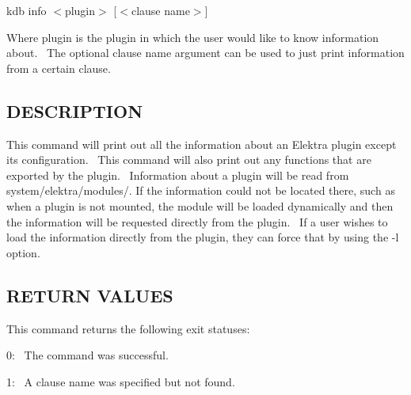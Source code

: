 {\ttfamily kdb info $<$plugin$>$ \mbox{[}$<$clause name$>$\mbox{]}}~\newline


Where {\ttfamily plugin} is the plugin in which the user would like to know information about.~\newline
 The optional {\ttfamily clause name} argument can be used to just print information from a certain clause.~\newline


\subsection*{D\+E\+S\+C\+R\+I\+P\+T\+I\+ON}

This command will print out all the information about an Elektra plugin except it\textquotesingle{}s configuration.~\newline
 This command will also print out any functions that are exported by the plugin.~\newline
 Information about a plugin will be read from {\ttfamily system/elektra/modules/}. If the information could not be located there, such as when a plugin is not mounted, the module will be loaded dynamically and then the information will be requested directly from the plugin.~\newline
 If a user wishes to load the information directly from the plugin, they can force that by using the {\ttfamily -\/l} option.~\newline


\subsection*{R\+E\+T\+U\+RN V\+A\+L\+U\+ES}

This command returns the following exit statuses\+:~\newline



\begin{DoxyItemize}
\item 0\+:~\newline
 The command was successful.~\newline

\item 1\+:~\newline
 A {\ttfamily clause name} was specified but not found.~\newline

\end{DoxyItemize}

